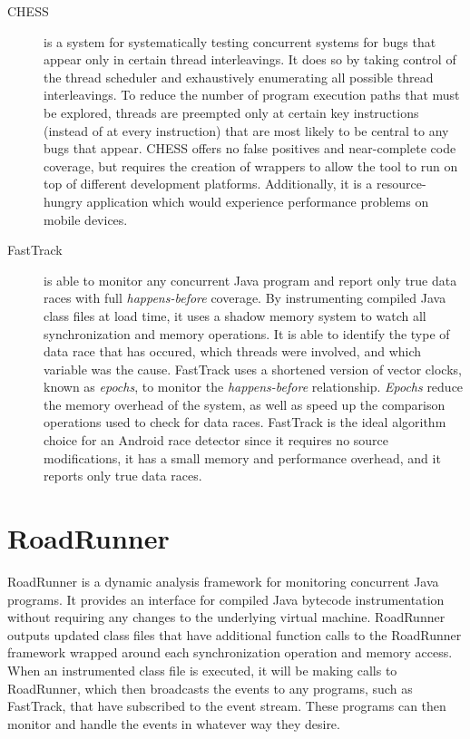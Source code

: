 \documentclass{acm_proc_article-sp}
\begin{document}
\begin{description}
\item[CHESS] \cite{Musuvathi2008} is a system for systematically testing concurrent systems for bugs that appear only in certain thread interleavings. It does so by taking control of the thread scheduler and exhaustively enumerating all possible thread interleavings. To reduce the number of program execution paths that must be explored, threads are preempted only at certain key instructions (instead of at every instruction) that are most likely to be central to any bugs that appear. CHESS offers no false positives and near-complete code coverage, but requires the creation of wrappers to allow the tool to run on top of different development platforms. Additionally, it is a resource-hungry  application which would experience performance problems on mobile devices.


\item[FastTrack] \cite{Flanagan2009} is able to monitor any concurrent Java program and report only true data races with full \emph{happens-before} coverage. By instrumenting compiled Java class files at load time, it uses a shadow memory system to watch all synchronization and memory  operations. It is able to identify the type of data race that has occured, which threads were involved, and which variable was the cause.  FastTrack uses a shortened version of vector clocks, known as \emph{epochs}, to monitor the \emph{happens-before} relationship. \emph{Epochs} reduce the memory overhead of the system, as well as speed up the comparison operations used to check for data races. FastTrack is the ideal algorithm choice for an Android race detector since it requires no source modifications, it has a small memory and performance overhead, and it reports only true data races.
\end{description}

\section{RoadRunner}
RoadRunner is a dynamic analysis framework for monitoring concurrent Java programs. It provides an interface for compiled Java bytecode instrumentation without requiring any changes to the underlying virtual machine. RoadRunner outputs updated class files that have additional function calls to the RoadRunner framework wrapped around each synchronization operation and memory access. When an instrumented class file is executed, it will be making calls to RoadRunner, which then broadcasts the events to any programs, such as FastTrack, that have subscribed to the event stream. These programs can then monitor and handle the events in whatever way they desire.
\end{document}
